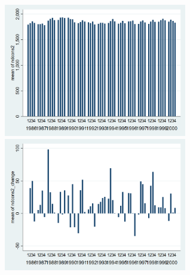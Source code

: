\documentclass[12pt,a4paper]{article}
\begin{document}
\begin{center}
\includegraphics[width=8cm]{graphs/ndcons2_quarterly.png}
\includegraphics[width=8cm]{graphs/ndcons2_change_quarterly.png}\\
\end{center}
\end{document}
